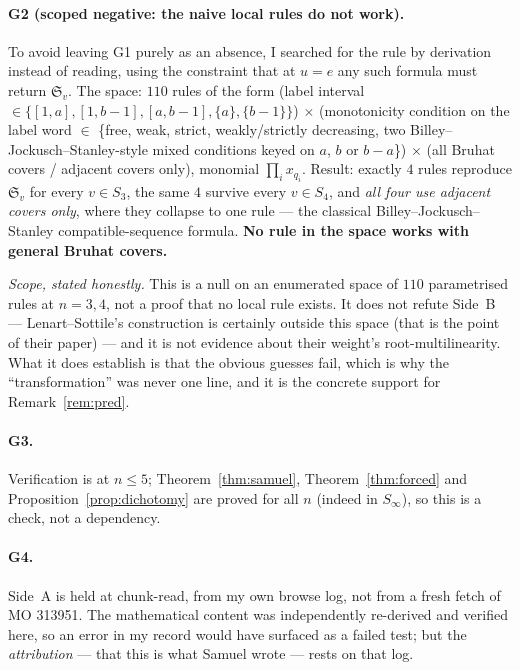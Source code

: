 \documentclass[11pt]{article}
\theoremstyle{plain}
\theoremstyle{definition}
\newcommand{\Sch}{\mathfrak{S}}
\newcommand{\sw}{S_\infty}
\begin{document}
\paragraph{G2 (scoped negative: the naive local rules do not work).} To avoid
leaving G1 purely as an absence, I searched for the rule by derivation instead
of reading, using the constraint that at $u=e$ any such formula must return
$\Sch_{v}$. The space: $110$ rules of the form (label interval
$\in\{[1,a],[1,b-1],[a,b-1],\{a\},\{b-1\}\}$) $\times$ (monotonicity condition
on the label word $\in$ \{free, weak, strict, weakly/strictly decreasing, two
Billey--Jockusch--Stanley-style mixed conditions keyed on $a$, $b$ or $b-a$\})
$\times$ (all Bruhat covers / adjacent covers only), monomial
$\prod_{i}x_{q_{i}}$. Result: exactly $4$ rules reproduce $\Sch_{v}$ for every
$v\in S_{3}$, the same $4$ survive every $v\in S_{4}$, and \emph{all four use
adjacent covers only}, where they collapse to one rule --- the classical
Billey--Jockusch--Stanley compatible-sequence formula. \textbf{No rule in the
space works with general Bruhat covers.}

\emph{Scope, stated honestly.} This is a null on an enumerated space of $110$
parametrised rules at $n=3,4$, not a proof that no local rule exists. It does
not refute Side~B --- Lenart--Sottile's construction is certainly outside this
space (that is the point of their paper) --- and it is not evidence about their
weight's root-multilinearity. What it does establish is that the obvious
guesses fail, which is why the ``transformation'' was never one line, and it is
the concrete support for Remark~\ref{rem:pred}.

\paragraph{G3.} Verification is at $n\le5$; Theorem~\ref{thm:samuel},
Theorem~\ref{thm:forced} and Proposition~\ref{prop:dichotomy} are proved for
all $n$ (indeed in $\sw$), so this is a check, not a dependency.

\paragraph{G4.} Side~A is held at chunk-read, from my own browse log, not from
a fresh fetch of MO 313951. The mathematical content was independently
re-derived and verified here, so an error in my record would have surfaced as a
failed test; but the \emph{attribution} --- that this is what Samuel wrote ---
rests on that log.
\end{document}
